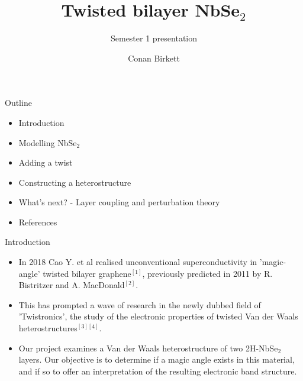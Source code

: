 \documentclass[9pt]{beamer}
\title{Twisted bilayer NbSe$_2$}
\subtitle{Semester 1 presentation}
\author{Conan Birkett}
\institute{University of Bath department of Physics}
\begin{document}
\begin{frame}
  \titlepage
\end{frame}

\begin{frame}{Outline}
  \begin{itemize}
      \item Introduction
      \item Modelling NbSe$_2$
      \item Adding a twist
      \item Constructing a heterostructure
      \item What's next? - Layer coupling and perturbation theory
      \item References
  \end{itemize}
\end{frame}

\begin{frame}{Introduction}
  \begin{itemize}
    \item In 2018 Cao Y. et al realised unconventional superconductivity in 'magic-angle' twisted bilayer graphene$^{[1]}$, previously predicted in 2011 by R. Bistritzer and A. MacDonald$^{[2]}$.

    \item This has prompted a wave of research in the newly dubbed field of 'Twistronics', the study of the electronic properties of twisted Van der Waals heterostructures$^{[3][4]}$.

    \item Our project examines a Van der Waals heterostructure of two 2H-NbSe$_2$ layers. Our objective is to determine if a magic angle exists in this material, and if so to offer an interpretation of the resulting electronic band structure.
  \end{itemize}
\end{frame}
\end{document}
